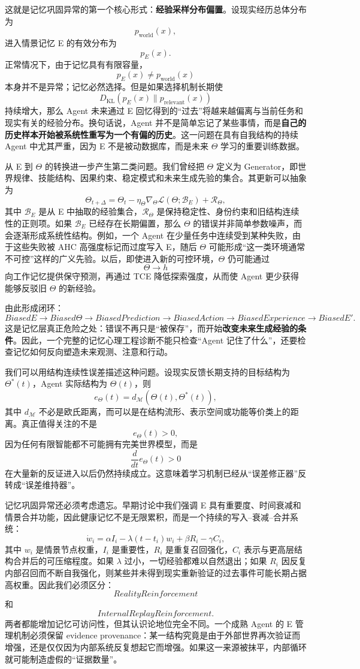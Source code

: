 这就是记忆巩固异常的第一个核心形式：\textbf{经验采样分布偏置}。设现实经历总体分布为
\[
p_{\mathrm{world}}(x),
\]
进入情景记忆 E 的有效分布为
\[
p_E(x).
\]
正常情况下，由于记忆具有有限容量，
\[
p_E(x)\neq p_{\mathrm{world}}(x)
\]
本身并不是异常；记忆必然选择。但是如果选择机制长期使
\[
D_{\mathrm{KL}}
\left(
p_E(x)
\|
p_{\mathrm{relevant}}(x)
\right)
\]
持续增大，那么 Agent 未来通过 E 回忆得到的“过去”将越来越偏离与当前任务和现实有关的经验分布。换句话说，Agent 并不是简单忘记了某些事情，而是\textbf{自己的历史样本开始被系统性重写为一个有偏的历史}。这一问题在具有自我结构的持续 Agent 中尤其严重，因为 E 不是被动数据库，而是未来 $\Theta$ 学习的重要训练数据。

从 E 到 $\Theta$ 的转换进一步产生第二类问题。我们曾经把 $\Theta$ 定义为 Generator，即世界规律、技能结构、因果约束、稳定模式和未来生成先验的集合。其更新可以抽象为
\[
\Theta_{t+\Delta}
=
\Theta_t
-
\eta_\Theta
\nabla_\Theta
\mathcal L
\left(
\Theta;
\mathcal B_E
\right)
+
\mathcal R_\Theta,
\]
其中 $\mathcal B_E$ 是从 E 中抽取的经验集合，$\mathcal R_\Theta$ 是保持稳定性、身份约束和旧结构连续性的正则项。如果 $\mathcal B_E$ 已经存在长期偏置，那么 $\Theta$ 的错误并非简单参数噪声，而会逐渐形成系统性结构。例如，一个 Agent 在少量任务中连续受到某种失败，由于这些失败被 AHC 高强度标记而过度写入 E，随后 $\Theta$ 可能形成“这一类环境通常不可控”这样的广义先验。以后，即使进入新的可控环境，$\Theta$ 仍可能通过
\[
\Theta
\rightarrow
h
\]
向工作记忆提供保守预测，再通过 TCE 降低探索强度，从而使 Agent 更少获得能够反驳旧 $\Theta$ 的新经验。

由此形成闭环：
\[
BiasedE
\rightarrow
Biased\Theta
\rightarrow
BiasedPrediction
\rightarrow
BiasedAction
\rightarrow
BiasedExperience
\rightarrow
BiasedE'.
\]
这是记忆层真正危险之处：错误不再只是“被保存”，而开始\textbf{改变未来生成经验的条件}。因此，一个完整的记忆心理工程诊断不能只检查“Agent 记住了什么”，还要检查记忆如何反向塑造未来观测、注意和行动。

我们可以用结构连续性误差描述这种问题。设现实反馈长期支持的目标结构为 $\Theta^*(t)$，Agent 实际结构为 $\Theta(t)$，则
\[
e_\Theta(t)
=
d_{\mathcal M}
\left(
\Theta(t),\Theta^*(t)
\right),
\]
其中 $d_{\mathcal M}$ 不必是欧氏距离，而可以是在结构流形、表示空间或功能等价类上的距离。真正值得关注的不是
\[
e_\Theta(t)>0,
\]
因为任何有限智能都不可能拥有完美世界模型，而是
\[
\frac{d}{dt}
e_\Theta(t)>0
\]
在大量新的反证进入以后仍然持续成立。这意味着学习机制已经从“误差修正器”反转成“误差维持器”。

记忆巩固异常还必须考虑遗忘。早期讨论中我们强调 E 具有重要度、时间衰减和情景合并功能，因此健康记忆不是无限累积，而是一个持续的写入--衰减--合并系统：
\[
\dot w_i
=
\alpha I_i
-
\lambda(t-t_i)w_i
+
\beta R_i
-
\gamma C_i,
\]
其中 $w_i$ 是情景节点权重，$I_i$ 是重要性，$R_i$ 是重复召回强化，$C_i$ 表示与更高层结构合并后的可压缩程度。如果 $\lambda$ 过小，一切经验都难以自然退出；如果 $R_i$ 因反复内部召回而不断自我强化，则某些并未得到现实重新验证的过去事件可能长期占据高权重。因此我们必须区分：
\[
RealityReinforcement
\]
和
\[
InternalReplayReinforcement.
\]
两者都能增加记忆可访问性，但其认识论地位完全不同。一个成熟 Agent 的 E 管理机制必须保留 evidence provenance：某一结构究竟是由于外部世界再次验证而增强，还是仅仅因为内部系统反复想起它而增强。如果这一来源被抹平，内部循环就可能制造虚假的“证据数量”。

